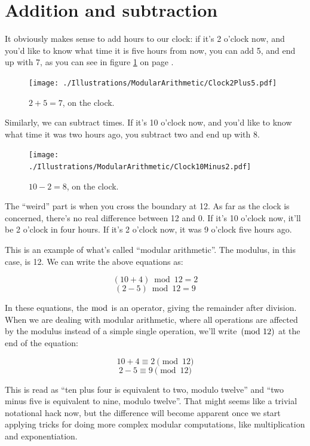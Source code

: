\documentclass[11pt,ebook,table,dvipsnames]{memoir}
\begin{document}
\section{Addition and subtraction\label{Modular-addition}\label{Modular-subtraction}}
\label{sec-4-1-1}

It obviously makes sense to add hours to our clock: if it's 2 o'clock
now, and you'd like to know what time it is five hours from now, you
can add 5, and end up with 7, as you can see in figure
\ref{fig:Clock2Plus5} on page \pageref{fig:Clock2Plus5}.

\begin{figure}[ht!]
\centering
\texttt{[image: ./Illustrations/ModularArithmetic/Clock2Plus5.pdf]}
\caption{$2 + 5 = 7$, on the clock.}
\label{fig:Clock2Plus5}
\end{figure}

Similarly, we can subtract times. If it's 10 o'clock now, and you'd
like to know what time it was two hours ago, you subtract two and end
up with 8.

\begin{figure}[ht!]
\centering
\texttt{[image: ./Illustrations/ModularArithmetic/Clock10Minus2.pdf]}
\caption{$10 - 2 = 8$, on the clock.}
\label{fig:ClockMinus}
\end{figure}

The \enquote{weird} part is when you cross the boundary at 12. As far as the
clock is concerned, there's no real difference between 12 and 0. If
it's 10 o'clock now, it'll be 2 o'clock in four hours. If it's 2
o'clock now, it was 9 o'clock five hours ago.

This is an example of what's called \enquote{modular arithmetic}. The
modulus, in this case, is 12. We can write the above equations as:

\[
(10 + 4) \bmod{12} = 2
\]
\[
(2 - 5) \bmod{12} = 9
\]

In these equations, the $\bmod$ is an operator, giving the remainder
after division. When we are dealing with modular arithmetic, where all
operations are affected by the modulus instead of a simple single
operation, we'll write $\negthickspace\pmod{12}$ at the end of the
equation:

\[
10 + 4 \equiv 2 \pmod{12}
\]
\[
2 - 5 \equiv 9 \pmod{12}
\]

This is read as \enquote{ten plus four is equivalent to two, modulo twelve}
and \enquote{two minus five is equivalent to nine, modulo twelve}. That might
seems like a trivial notational hack now, but the difference will
become apparent once we start applying tricks for doing more complex
modular computations, like multiplication and exponentiation.
\end{document}
